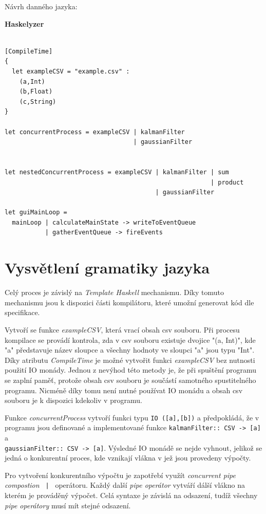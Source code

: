 \documentclass[male,czech]{kithesis}
\newcommand{\haskellInline}[1]{\colorbox{gray!10}{\texttt{#1}}}
\begin{document}
\setlength{\parindent}{0pt}
Návrh danného jazyka:

\textbf{Haskelyzer}
\begin{verbatim}

[CompileTime]
{
  let exampleCSV = "example.csv" :
    (a,Int)
    (b,Float)
    (c,String)
}

let concurrentProcess = exampleCSV | kalmanFilter 
                                   | gaussianFilter 
                                      

let nestedConcurrentProcess = exampleCSV | kalmanFilter | sum
                                                        | product
                                         | gaussianFilter

let guiMainLoop = 
  mainLoop | calculateMainState -> writeToEventQueue
           | gatherEventQueue -> fireEvents

\end{verbatim}

\section{Vysvětlení gramatiky jazyka}

Celý proces je závislý na \textit{Template Haskell} mechanismu. Díky tomuto mechanismu jsou k dispozici části kompilátoru, které umožní generovat kód dle specifikace.

Vytvoří se funkce \textit{exampleCSV}, která vrací obsah csv souboru. Při procesu kompilace se provádí kontrola, zda v csv souboru existuje dvojice "(a, Int)", kde "a" představuje název sloupce a všechny hodnoty ve sloupci "a" jsou typu "Int".
Díky atributu \textit{CompileTime} je možné vytvořit funkci \textit{exampleCSV} bez nutnosti použití IO monády. Jednou z nevýhod této metody je, že při spuštění programu se zaplní paměť, protože obsah csv souboru je součástí samotného spustitelného programu.
Nicméně díky tomu není nutné používat IO monádu a obsah csv souboru je k dispozici kdekoliv v programu.

Funkce \textit{concurrentProcess} vytvoří funkci typu \haskellInline{IO ([a],[b])} a předpokládá, že v programu jsou definované a implementované funkce
\haskellInline{kalmanFilter:: CSV -> [a]} a \\
\haskellInline{gaussianFilter:: CSV -> [a]}. Výsledné IO monádě se nejde vyhnout, jelikož se jedná o konkurentní proces, kde vznikají vlákna v jež jsou provedeny výpočty. 

Pro vytvoření konkurentního výpočtu je zapotřebí využít \textit{concurrent pipe compostion}
\haskellInline{ | } operátoru. Každý další \textit{pipe operátor} vytváří dálší vlákno na kterém je prováděný výpočet.
Celá syntaxe je závislá na odsazení, tudíž všechny \textit{pipe operátory} musí mít stejné odsazení.
\end{document}
